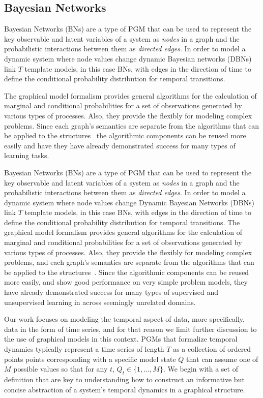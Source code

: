 \subsection{Bayesian Networks}
Bayesian Networks (BNs) are a type of PGM that can be used to represent the key observable and latent variables of a system as \emph{nodes} in a graph and the probabilistic interactions between them as \emph{directed edges}.  In order to model a dynamic system where node values change dynamic Bayesian networks (DBNs) link $T$ template models, in this case BNs, with edges in the direction of time to define the conditional probability distribution for temporal transitions.

The graphical model formalism provides general algorithms for the calculation of marginal and conditional probabilities for a set of observations generated by various types of processes.  Also, they provide the flexibly for modeling complex problems.  Since each graph's semantics are separate from the algorithms that can be applied to the structures~\cite{koller} the algorithmic components can be reused more easily and have they have already demonstrated success for many types of learning tasks.


Bayesian Networks (BNs) are a type of PGM that can be used to represent the key observable and latent variables of a system as \emph{nodes} in a graph and the probabilistic interactions between them as \emph{directed edges}.  In order to model a dynamic system where node values change Dynamic Bayesian Networks (DBNs) link $T$ template models, in this case BNs, with edges in the direction of time to define the conditional probability distribution for temporal transitions. The graphical model formalism provides general algorithms for the calculation of marginal and conditional probabilities for a set of observations generated by various types of processes.  Also, they provide the flexibly for modeling complex problems, and each graph's semantics are separate from the algorithms that can be applied to the structures~\cite{koller}.  Since the algorithmic components can be reused more easily, and show good performance on very simple problem models, they have already demonstrated success for many types of supervised and unsupervised learning in across seemingly unrelated domains.

Our work focuses on modeling the temporal aspect of data, more specifically, data in the form of time series, and for that reason we limit further discussion to the use of graphical models in this context.  PGMs that formalize temporal dynamics typically represent a time series of length $T$ as a collection of ordered points points corresponding with a specific model state $Q$ that can assume one of $M$ possible values so that for any $t$, $Q_{t} \in \{1,...,M\}$.  We begin with a set of definition that are key to understanding how to construct an informative but concise abstraction of a system's temporal dynamics in a graphical structure.

